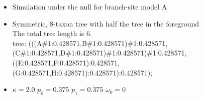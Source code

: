 \documentclass[12pt,letterpaper]{article}\usepackage[]{graphicx}\usepackage[]{color}
\newenvironment{knitrout}{}{} %
\begin{document}
\begin{itemize}
\item Simulation under the null for branch-site model A
\item Symmetric, 8-taxon tree with half the tree in the foreground\\
  The total tree length is 6.\\
  tree: (((A\#1:0.428571,B\#1:0.428571)\#1:0.428571,(C\#1:0.428571,D\#1:0.428571)\#1:0.428571)\#1:0.428571,\\((E:0.428571,F:0.428571):0.428571,(G:0.428571,H:0.428571):0.428571):0.428571);
\item $\kappa=2.0$ $p_0=0.375$ $p_1=0.375$ $\omega_0=0$
\end{itemize}

\begin{knitrout}
\color{fgcolor}


\end{knitrout}
\end{document}
